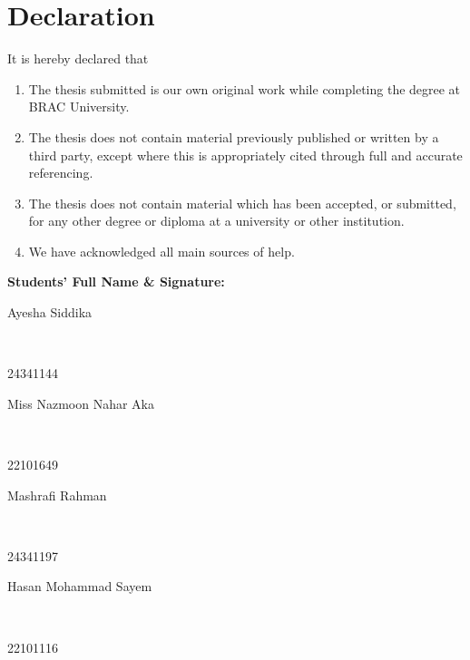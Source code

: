 \newcommand*\wildcard[2][6cm]{\vspace{2cm}\parbox{#1}{\hrulefill\par#2}}

\section*{Declaration}

It is hereby declared that

\begin{enumerate}
  \item The thesis submitted is our own original work while completing the degree at BRAC University.
  \item The thesis does not contain material previously published or written by a third party, except where this is appropriately cited through full and accurate referencing.
  \item The thesis does not contain material which has been accepted, or submitted, for any other degree or diploma at a university or other institution.
  \item We have acknowledged all main sources of help.
\end{enumerate}

\vspace{1cm}
\textbf{Students' Full Name \& Signature:}

\begingroup

    \begin{center}
        \wildcard{\centerline{Ayesha Siddika} ~\\ \centerline{24341144}}
        \hspace{2cm}
        \wildcard{\centerline{Miss Nazmoon Nahar Aka} ~\\ \centerline{22101649}}

        \wildcard{\centerline{Mashrafi Rahman} ~\\ \centerline{24341197}}
        \hspace{2cm}
        \wildcard{\centerline{Hasan Mohammad Sayem} ~\\ \centerline{22101116}}
    \end{center}

\endgroup

\pagebreak
